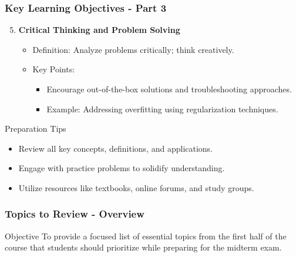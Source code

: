 \documentclass[aspectratio=169]{beamer}
\begin{document}
\begin{frame}[fragile]
    \frametitle{Key Learning Objectives - Part 3}
    \begin{enumerate}
        \setcounter{enumi}{4} %
        \item \textbf{Critical Thinking and Problem Solving}
        \begin{itemize}
            \item Definition: Analyze problems critically; think creatively.
            \item Key Points:
            \begin{itemize}
                \item Encourage out-of-the-box solutions and troubleshooting approaches.
                \item Example: Addressing overfitting using regularization techniques.
            \end{itemize}
        \end{itemize}
    \end{enumerate}
    
    \begin{block}{Preparation Tips}
        \begin{itemize}
            \item Review all key concepts, definitions, and applications.
            \item Engage with practice problems to solidify understanding.
            \item Utilize resources like textbooks, online forums, and study groups.
        \end{itemize}
    \end{block}
\end{frame}

\begin{frame}[fragile]
    \frametitle{Topics to Review - Overview}
    \begin{block}{Objective}
        To provide a focused list of essential topics from the first half of the course that students should prioritize while preparing for the midterm exam.
    \end{block}
\end{frame}
\end{document}

